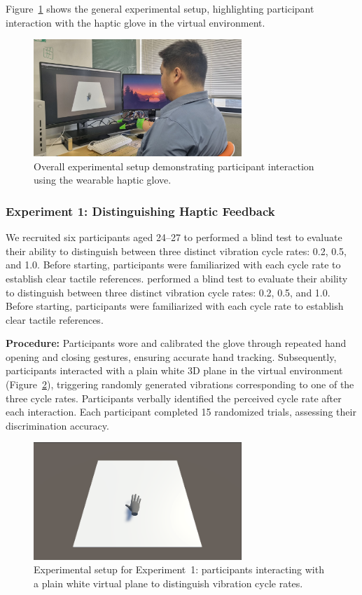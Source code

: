 \documentclass[graybox]{svmult}
\begin{document}
Figure~\ref{fig:experiment_setup} shows the general experimental setup, highlighting participant interaction with the haptic glove in the virtual environment.

\begin{figure}\centering
	\includegraphics[width=0.7\textwidth]{figure/experiment.png}%
	\caption{Overall experimental setup demonstrating participant interaction using the wearable haptic glove.}\label{fig:experiment_setup}
\end{figure}

\subsubsection{Experiment 1: Distinguishing Haptic Feedback}
We recruited six participants aged 24–27 to performed a blind test to evaluate their ability to distinguish between three distinct vibration cycle rates: 0.2, 0.5, and 1.0. Before starting, participants were familiarized with each cycle rate to establish clear tactile references.
performed a blind test to evaluate their ability to distinguish between three distinct vibration cycle rates: 0.2, 0.5, and 1.0. Before starting, participants were familiarized with each cycle rate to establish clear tactile references.

\textbf{Procedure:} Participants wore and calibrated the glove through repeated hand opening and closing gestures, ensuring accurate hand tracking. Subsequently, participants interacted with a plain white 3D plane in the virtual environment (Figure~\ref{fig:experiment1_setup}), triggering randomly generated vibrations corresponding to one of the three cycle rates. Participants verbally identified the perceived cycle rate after each interaction. Each participant completed 15 randomized trials, assessing their discrimination accuracy.

\begin{figure}[H]
	\centering
	\includegraphics[width=0.7\textwidth]{figure/ex1.png}%
	\caption{Experimental setup for Experiment~1: participants interacting with a plain white virtual plane to distinguish vibration cycle rates.}\label{fig:experiment1_setup}
\end{figure}
\end{document}
